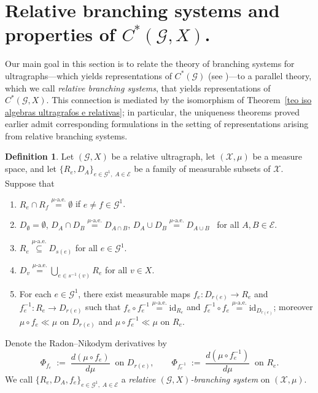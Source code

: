 \documentclass[12pt, reqno]{amsart}
\theoremstyle{definition}
\newtheorem{definition}[theorem]{Definition}
\theoremstyle{remark}
\numberwithin{equation}{section}
\newcommand{\G}{\mathcal{G}}
\begin{document}

\section{Relative branching systems and properties of $C^*(\G,X)$.}\label{BSU}
Our main goal in this section is to relate the theory of branching systems for ultragraphs—which
yields representations of $C^*(\mathcal{G})$ (see \cite{DDH})—to a parallel theory, which we call
\emph{relative branching systems}, that yields representations of $C^*(\mathcal{G},X)$. This
connection is mediated by the isomorphism of
Theorem~\ref{teo iso algebras ultragrafos e relativas}; in particular, the uniqueness theorems
proved earlier admit corresponding formulations in the setting of representations arising from relative branching systems.



\begin{definition}\label{relativebs}
Let $(\mathcal{G},X)$ be a relative ultragraph, let $(\mathcal{X},\mu)$ be a measure space, and
let $\{R_e,D_A\}_{e\in \mathcal{G}^1,\;A\in \mathcal{E}}$ be a family of measurable subsets of
$\mathcal{X}$. Suppose that
\begin{enumerate}
\item\label{R_e cap R_f =emptyset if e neq f}
$R_e \cap R_f \overset{\mu\text{-a.e.}}{=} \emptyset$ if $e \neq f \in \mathcal{G}^1$.
\item
$D_\emptyset=\emptyset$, \quad
$D_A \cap D_B \overset{\mu\text{-a.e.}}{=} D_{A \cap B}$, \quad
$D_A \cup D_B \overset{\mu\text{-a.e.}}{=} D_{A \cup B}$ \ for all $A,B \in \mathcal{E}$.
\item
$R_e \overset{\mu\text{-a.e.}}{\subseteq} D_{s(e)}$ for all $e\in \mathcal{G}^1$.
\item\label{D_v=cup_{e in s^{-1}(v)}R_e}
$D_v \overset{\mu\text{-a.e.}}{=} \displaystyle\bigcup_{e \in s^{-1}(v)} R_e$ for all $v \in X$.
\item
For each $e\in \mathcal{G}^1$, there exist measurable maps
$f_e: D_{r(e)} \to R_e$ and $f_e^{-1}: R_e \to D_{r(e)}$ such that
$f_e \circ f_e^{-1} \overset{\mu\text{-a.e.}}{=} \mathrm{id}_{R_e}$ and
$f_e^{-1} \circ f_e \overset{\mu\text{-a.e.}}{=} \mathrm{id}_{D_{r(e)}}$; moreover
$\mu \circ f_e \ll \mu$ on $D_{r(e)}$ and $\mu \circ f_e^{-1} \ll \mu$ on $R_e$.
\end{enumerate}
Denote the Radon–Nikodym derivatives by
\[
\Phi_{f_e} \;:=\; \frac{d(\mu \circ f_e)}{d\mu}\ \text{ on } D_{r(e)},
\qquad
\Phi_{f_e^{-1}} \;:=\; \frac{d(\mu \circ f_e^{-1})}{d\mu}\ \text{ on } R_e.
\]
We call $\{R_e,D_A,f_e\}_{e \in \mathcal{G}^1,\;A \in \mathcal{E}}$ a
\emph{relative $(\mathcal{G},X)$-branching system} on $(\mathcal{X},\mu)$.
\end{definition}
\end{document}
